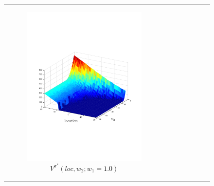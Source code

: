 \documentclass[letterpaper]{article}
\begin{document}
{\centering
    \begin{figure}[]
        \begin{tabular}{cc}
            \begin{subfigure}{0.45\columnwidth}
                \centering
                \includegraphics[width=\textwidth]{robot_vf_new}
                \caption{{\footnotesize $V^{\pi^{*}}(loc, w_2; w_1 = 1.0)$}}
                \label{fig:navigation_vf}
            \end{subfigure} &
            \begin{subfigure}{0.45\columnwidth}
                \centering

\end{subfigure}
\end{tabular}
\end{figure}}
\end{document}

